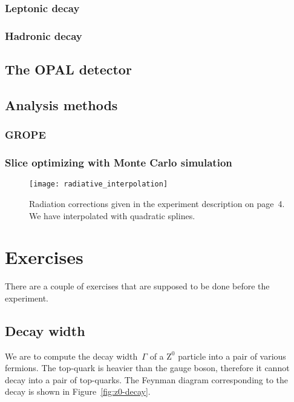 \documentclass[11pt, english, fleqn, DIV=15, headinclude, BCOR=2cm]{scrreprt}
\begin{document}
\subsection{Leptonic decay}

\subsection{Hadronic decay}

\section{The OPAL detector}

\section{Analysis methods}

\subsection{GROPE}

\subsection{Slice optimizing with Monte Carlo simulation}

\begin{figure}
    \centering
    \texttt{[image: radiative\_interpolation]}
    \caption{%
        Radiation corrections given in the experiment description on page~4. We
        have interpolated with quadratic splines.
    }
    \label{fig:radiative_interpolation}
\end{figure}

\chapter{Exercises}

There are a couple of exercises that are supposed to be done before the
experiment.

\section{Decay width}

We are to compute the decay width~$\Gamma$ of a $\mathrm Z^0$ particle into a
pair of various fermions. The top-quark is heavier than the gauge boson,
therefore it cannot decay into a pair of top-quarks. The Feynman diagram
corresponding to the decay is shown in Figure~\ref{fig:z0-decay}.
\end{document}
